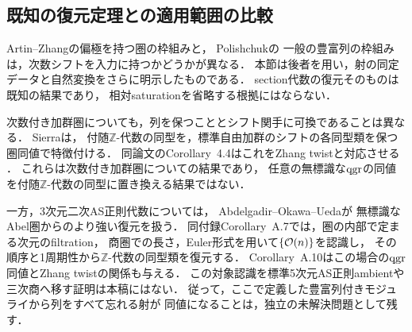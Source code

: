 \subsection{既知の復元定理との適用範囲の比較}

Artin--Zhang\cite{AZ}の偏極を持つ圏の枠組みと，
Polishchuk\cite[Theorem~2.4 and Remark~2 following it]{PolishchukProj}の
一般の豊富列の枠組みは，次数シフトを入力に持つかどうかが異なる．
本節は後者を用い，射の同定データと自然変換をさらに明示したものである．
section代数の復元そのものは既知の結果であり，
相対saturationを省略する根拠にはならない．

次数付き加群圏についても，列を保つこととシフト関手に可換であることは異なる．
Sierra\cite[Theorem~3.6 and the following Remark]{SierraGAlgebras}は，
付随$\mathbb Z$-代数の同型を，標準自由加群のシフトの各同型類を保つ圏同値で特徴付ける．
同論文のCorollary~4.4はこれをZhang twistと対応させる
\cite{SierraGAlgebras,Zhang}．
これらは次数付き加群圏についての結果であり，
任意の無標識な$\operatorname{qgr}$の同値を付随$\mathbb Z$-代数の同型に置き換える結果ではない．

一方，3次元二次AS正則代数については，
Abdelgadir--Okawa--Ueda\cite[Theorem~7.3, Appendix~A]{AOUNCPlanes}が
無標識なAbel圏からのより強い復元を扱う．
同付録Corollary~A.7では，圏の内部で定まる次元のfiltration，
商圏での長さ，Euler形式を用いて$\{\mathcal O(n)\}$を認識し，
その順序と1周期性から$\mathbb Z$-代数の同型類を復元する．
Corollary~A.10はこの場合の$\operatorname{qgr}$同値とZhang twistの関係も与える．
この対象認識を標準5次元AS正則ambientや三次商へ移す証明は本稿にはない．
従って，ここで定義した豊富列付きモジュライから列をすべて忘れる射が
同値になることは，独立の未解決問題として残す．
